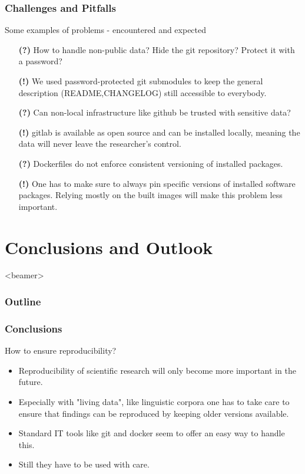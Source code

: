     \begin{frame}
        \frametitle{Challenges and Pitfalls}
        \begin{block}{Some examples of problems - encountered and expected}
            \begin{itemize}
				\pause
				\item[\textbf{(?)}] How to handle non-public data? Hide the git repository? Protect it with a password?
				\pause
				\item[\textbf{(!)}] We used password-protected git submodules to keep the general description (README,CHANGELOG) still accessible to everybody.
				\pause
				\item[\textbf{(?)}] Can non-local infrastructure like github be trusted with sensitive data?
				\pause
				\item[\textbf{(!)}] gitlab is available as open source and can be installed locally, meaning the data will never leave the researcher's control.
				\pause
	 			\item[\textbf{(?)}] Dockerfiles do not enforce consistent versioning of installed packages.
				\pause
				\item[\textbf{(!)}] One has to make sure to always pin specific versions of installed software packages. Relying mostly on the built images will make this problem less important.
	     	\end{itemize}
        \end{block}
    \end{frame}

	\section[p.five]{Conclusions and Outlook}
	{%
	\begin{frame}<beamer>
	    \frametitle{Outline}
	\tableofcontents[currentsection]
	\end{frame}
	}

	\begin{frame}
        \frametitle{Conclusions}
        \begin{block}{How to ensure reproducibility?}
            \begin{itemize}
				\item Reproducibility of scientific research will only become more important in the future.
				\pause
				\item Especially with "living data", like linguistic corpora one has to take care to ensure that findings can be reproduced by keeping older versions available.
				\pause
				\item Standard IT tools like git and docker seem to offer an easy way to handle this.
				\pause
	 			\item Still they have to be used with care.
	     	\end{itemize}
        \end{block}
    \end{frame}

